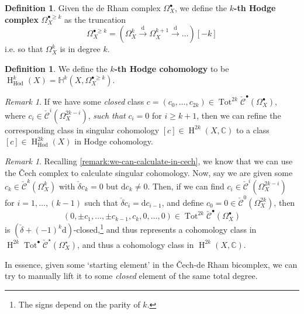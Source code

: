 \documentclass[11pt,fleqn]{article}
\theoremstyle{plain}
\theoremstyle{definition}
\newtheorem{definition}[theorem]{Definition}
\theoremstyle{remark}
\newtheorem{remark}[theorem]{Remark}
\numberwithin{equation}{theorem}
\newcommand{\anotherbullet}{\star}
\newcommand{\cech}{\check{\mathscr{C}}}
\newcommand{\define}[1]{\textbf{#1}}
\renewcommand{\d}{\mathrm{d}}
\DeclareMathOperator{\Tot}{Tot}
\DeclareMathOperator{\HH}{H}
\begin{document}
        \begin{definition}
            Given the de Rham complex $\Omega_X^\bullet$, we define the \define{$k$-th Hodge complex} $\Omega_X^{\bullet\geqslant k}$ as the truncation
            \begin{equation*}
                \Omega_X^{\bullet\geqslant k} = \left(\Omega_X^k\xrightarrow{\d}\Omega_X^{k+1}\xrightarrow{\d}\ldots\right)[-k]
            \end{equation*}
            i.e. so that $\Omega_X^k$ is in degree $k$.
        \end{definition}

        \begin{definition}
            We define the \define{$k$-th Hodge cohomology} to be $\HH_\text{Hod}^k(X)=\mathbb{H}^k(X,\Omega_X^{\bullet\geqslant k})$.
        \end{definition}

        \begin{remark}\label{remark:when-can-we-refine-to-hodge}
            If we have some \emph{closed} class $c=(c_0,\ldots,c_{2k})\in\Tot^{2k}\cech^\bullet(\Omega^\bullet_X)$, where $c_i\in\cech^i(\Omega_X^{2k-i})$, \emph{such that} $c_i=0$ for $i\geqslant k+1$, then we can refine the corresponding class in singular cohomology $[c]\in\HH^{2k}(X,\mathbb{C})$ to a class $[c]\in\HH_\text{Hod}^{2k}(X)$ in Hodge cohomology.
        \end{remark}

        \begin{remark}\label{remark:how-to-manually-lift}
            Recalling \cref{remark:we-can-calculate-in-cech}, we know that we can use the Čech complex to calculate singular cohomology.
            Now, say we are given some $c_k\in\cech^k(\Omega_X^k)$ with $\check{\delta}c_k=0$ but $\d c_k\neq0$.
            Then, if we can find $c_i\in\cech^{i}(\Omega^{2k-i}_X)$ for $i=1,\ldots,(k-1)$ such that $\check\delta c_i=\d c_{i-1}$, and define $c_0=0\in\cech^0(\Omega_X^{2k})$, then
            \begin{equation*}
                (0,\pm c_1,\ldots,\pm c_{k-1},c_k,0,\ldots,0) \in \Tot^{2k}\cech^\bullet\left(\Omega^\bullet_X\right)
            \end{equation*}
            is $(\check\delta+(-1)^k\d)$-closed,\footnote{The signs depend on the parity of $k$.} and thus represents a cohomology class in $\HH^{2k}\Tot^\bullet\cech^\anotherbullet(\Omega_X^\anotherbullet)$, and thus a cohomology class in $\HH^{2k}(X,\mathbb{C})$.

            In essence, given some `starting element' in the Čech-de Rham bicomplex, we can try to manually lift it to some \emph{closed} element of the same total degree.
        \end{remark}
\end{document}
